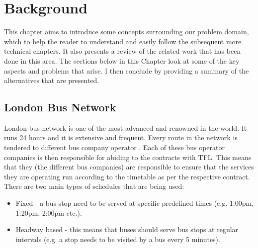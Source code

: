 \chapter{Background}
This chapter aims to introduce some concepts surrounding our problem domain, which to help the reader to understand and easily follow the subsequent more technical chapters. It also presents a review of the related work that has been done in this area. The sections below in this Chapter look at some of the key aspects and problems that arise. I then conclude by providing a summary of the alternatives that are presented.


\section{London Bus Network}
London bus network is one of the most advanced and renowned in the world. It runs 24 hours and it is extensive and frequent. Every route in the network is tendered to different bus company operator \cite{busTendering}. Each of these bus operator companies is then responsible for abiding to the contracts with TFL. This means that they (the different bus companies) are responsible to ensure that the services they are operating run according to the timetable as per the respective contract. There are two main types of schedules that are being used:
\begin{itemize}
	\item Fixed - a bus stop need to be served at specific predefined times (e.g. 1:00pm, 1:20pm, 2:00pm etc.).
	\item Headway based - this means that buses should serve bus stops at regular intervals (e.g. a stop needs to be visited by a bus every 5 minutes).
\end{itemize}

